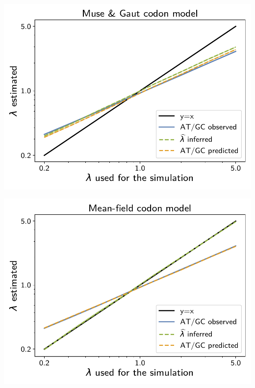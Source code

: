 \documentclass{article}
\begin{document}
\begin{center}
    \begin{minipage}{0.325\linewidth}
        \includegraphics[width=\linewidth, page=1]{inference_supp_mat/PrimatesExons10Mu2.0_lambda_MG.pdf}
    \end{minipage}
    \hfill
    \begin{minipage}{0.325\linewidth}
        \includegraphics[width=\linewidth, page=1]{inference_supp_mat/PrimatesExons10Mu2.0_lambda_MF.pdf}
    \end{minipage}
    \hfill

\end{center}
\end{document}
